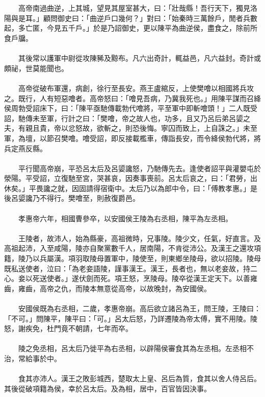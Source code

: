 \\\\
　　高帝南過曲逆，上其城，望見其屋室甚大，曰：「壯哉縣！吾行天下，獨見洛陽與是耳。」顧問御史曰：「曲逆戶口幾何？」對曰：「始秦時三萬餘戶，閒者兵數起，多亡匿，今見五千戶。」於是乃詔御史，更以陳平為曲逆侯，盡食之，除前所食戶牖。
\\\\
　　其後常以護軍中尉從攻陳豨及黥布。凡六出奇計，輒益邑，凡六益封。奇計或頗祕，世莫能聞也。
\\\\
　　高帝從破布軍還，病創，徐行至長安。燕王盧綰反，上使樊噲以相國將兵攻之。既行，人有短惡噲者。高帝怒曰：「噲見吾病，乃冀我死也。」用陳平謀而召絳侯周勃受詔床下，曰：「陳平亟馳傳載勃代噲將，平至軍中即斬噲頭！」二人既受詔，馳傳未至軍，行計之曰：「樊噲，帝之故人也，功多，且又乃呂后弟呂媭之夫，有親且貴，帝以忿怒故，欲斬之，則恐後悔。寧囚而致上，上自誅之。」未至軍，為壇，以節召樊噲。噲受詔，即反接載檻車，傳詣長安，而令絳侯勃代將，將兵定燕反縣。
\\\\
　　平行聞高帝崩，平恐呂太后及呂媭讒怒，乃馳傳先去。逢使者詔平與灌嬰屯於滎陽。平受詔，立復馳至宮，哭甚哀，因奏事喪前。呂太后哀之，曰：「君勞，出休矣。」平畏讒之就，因固請得宿衛中。太后乃以為郎中令，曰：「傅教孝惠。」是後呂媭讒乃不得行。樊噲至，則赦復爵邑。
\\\\
　　孝惠帝六年，相國曹參卒，以安國侯王陵為右丞相，陳平為左丞相。
\\\\
　　王陵者，故沛人，始為縣豪，高祖微時，兄事陵。陵少文，任氣，好直言。及高祖起沛，入至咸陽，陵亦自聚黨數千人，居南陽，不肯從沛公。及漢王之還攻項籍，陵乃以兵屬漢。項羽取陵母置軍中，陵使至，則東鄉坐陵母，欲以招陵。陵母既私送使者，泣曰：「為老妾語陵，謹事漢王。漢王，長者也，無以老妾故，持二心。妾以死送使者。」遂伏劍而死。項王怒，烹陵母。陵卒從漢王定天下。以善雍齒，雍齒，高帝之仇，而陵本無意從高帝，以故晚封，為安國侯。
\\\\
　　安國侯既為右丞相，二歲，孝惠帝崩。高后欲立諸呂為王，問王陵，王陵曰：「不可。」問陳平，陳平曰：「可。」呂太后怒，乃詳遷陵為帝太傅，實不用陵。陵怒，謝疾免，杜門竟不朝請，七年而卒。
\\\\
　　陵之免丞相，呂太后乃徙平為右丞相，以辟陽侯審食其為左丞相。左丞相不治，常給事於中。
\\\\
　　食其亦沛人。漢王之敗彭城西，楚取太上皇、呂后為質，食其以舍人侍呂后。其後從破項籍為侯，幸於呂太后。及為相，居中，百官皆因決事。
